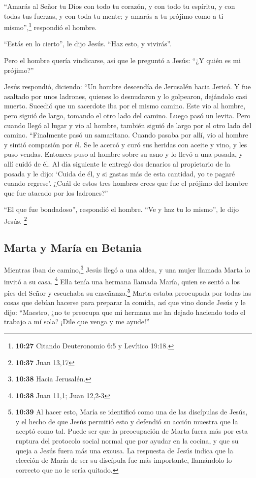  ``Amarás al Señor tu Dios con todo tu corazón, y con
todo tu espíritu, y con todas tus fuerzas, y con toda tu mente; y amarás
a tu prójimo como a ti mismo'',\footnote{\textbf{10:27} Citando
  Deuteronomio 6:5 y Levítico 19:18.} respondió el hombre.

 ``Estás en lo cierto'', le dijo Jesús. ``Haz esto, y
vivirás''.

 Pero el hombre quería vindicarse, así que le preguntó a
Jesús: ``¿Y quién es mi prójimo?''

 Jesús respondió, diciendo: ``Un hombre descendía de
Jerusalén hacia Jericó. Y fue asaltado por unos ladrones, quienes lo
desnudaron y lo golpearon, dejándolo casi muerto. 
Sucedió que un sacerdote iba por el mismo camino. Este vio al hombre,
pero siguió de largo, tomando el otro lado del camino. 
Luego pasó un levita. Pero cuando llegó al lugar y vio al hombre,
también siguió de largo por el otro lado del camino. 
``Finalmente pasó un samaritano. Cuando pasaba por allí, vio al hombre y
sintió compasión por él.  Se le acercó y curó sus heridas
con aceite y vino, y les puso vendas. Entonces puso al hombre sobre su
asno y lo llevó a una posada, y allí cuidó de él.  Al día
siguiente le entregó dos denarios al propietario de la posada y le dijo:
`Cuida de él, y si gastas más de esta cantidad, yo te pagaré cuando
regrese'.  ¿Cuál de estos tres hombres crees que fue el
prójimo del hombre que fue atacado por los ladrones?''

 ``El que fue bondadoso'', respondió el hombre. ``Ve y
haz tu lo mismo'', le dijo Jesús. \footnote{\textbf{10:37} Juan 13,17}

\hypertarget{marta-y-maruxeda-en-betania}{%
\subsection{Marta y María en
Betania}\label{marta-y-maruxeda-en-betania}}

 Mientras iban de camino,\footnote{\textbf{10:38} Hacia
  Jerusalén.} Jesús llegó a una aldea, y una mujer llamada Marta lo
invitó a su casa. \footnote{\textbf{10:38} Juan 11,1; Juan 12,2-3}
 Ella tenía una hermana llamada María, quien se sentó a
los pies del Señor y escuchaba su enseñanza.\footnote{\textbf{10:39} Al
  hacer esto, María se identificó como una de las discípulas de Jesús, y
  el hecho de que Jesús permitió esto y defendió su acción muestra que
  la aceptó como tal. Puede ser que la preocupación de Marta fuera más
  por esta ruptura del protocolo social normal que por ayudar en la
  cocina, y que su queja a Jesús fuera más una excusa. La respuesta de
  Jesús indica que la elección de María de ser su discípula fue más
  importante, llamándolo lo correcto que no le sería quitado.}
 Marta estaba preocupada por todas las cosas que debían
hacerse para preparar la comida, así que vino donde Jesús y le dijo:
``Maestro, ¿no te preocupa que mi hermana me ha dejado haciendo todo el
trabajo a mí sola? ¡Dile que venga y me ayude!''

